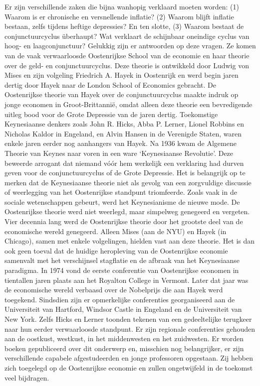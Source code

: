 \documentclass[
  a5paper,
  smalldemyvopaper,10pt,twoside,onecolumn,openright,extrafontsizes,hidelinks]{memoir}
\begin{document}
Er zijn verschillende zaken die bijna wanhopig verklaard moeten worden:
(1) Waarom is er chronische en versnellende inflatie? (2) Waarom blijft
inflatie bestaan, zelfs tijdens heftige depressies? En ten slotte, (3)
Waarom bestaat de conjunctuurcyclus überhaupt? Wat verklaart de
schijnbaar oneindige cyclus van hoog- en laagconjunctuur? Gelukkig zijn
er antwoorden op deze vragen. Ze komen van de vaak verwaarloosde
Oostenrijkse School van de economie en haar theorie over de geld- en
conjunctuurcyclus. Deze theorie is ontwikkeld door Ludwig von Mises en
zijn volgeling Friedrich A. Hayek in Oostenrijk en werd begin jaren
dertig door Hayek naar de London School of Economics gebracht. De
Oostenrijkse theorie van Hayek over de conjunctuurcyclus maakte indruk
op jonge economen in Groot-Brittannië, omdat alleen deze theorie een
bevredigende uitleg bood voor de Grote Depressie van de jaren dertig.
Toekomstige Keynesiaanse denkers zoals John R. Hicks, Abba P. Lerner,
Lionel Robbins en Nicholas Kaldor in Engeland, en Alvin Hansen in de
Verenigde Staten, waren enkele jaren eerder nog aanhangers van Hayek. Na
1936 kwam de Algemene Theorie van Keynes naar voren in een ware
`Keynesiaanse Revolutie'. Deze beweerde arrogant dat niemand vóór hem
werkelijk een verklaring had durven geven voor de conjunctuurcyclus of
de Grote Depressie. Het is belangrijk op te merken dat de Keynesiaanse
theorie niet als gevolg van een zorgvuldige discussie of weerlegging van
het Oostenrijkse standpunt triomfeerde. Zoals vaak in de sociale
wetenschappen gebeurt, werd het Keynesianisme de nieuwe mode. De
Oostenrijkse theorie werd niet weerlegd, maar simpelweg genegeerd en
vergeten. Vier decennia lang werd de Oostenrijkse theorie door het
grootste deel van de economische wereld genegeerd. Alleen Mises (aan de
NYU) en Hayek (in Chicago), samen met enkele volgelingen, hielden vast
aan deze theorie. Het is dan ook geen toeval dat de huidige heropleving
van de Oostenrijkse economie samenvalt met het verschijnsel stagflatie
en de afbraak van het Keynesiaanse paradigma. In 1974 vond de eerste
conferentie van Oostenrijkse economen in tientallen jaren plaats aan het
Royalton College in Vermont. Later dat jaar was de economische wereld
verbaasd over de Nobelprijs die aan Hayek werd toegekend. Sindsdien zijn
er opmerkelijke conferenties georganiseerd aan de Universiteit van
Hartford, Windsor Castle in Engeland en de Universiteit van New York.
Zelfs Hicks en Lerner toonden tekenen van een gedeeltelijke terugkeer
naar hun eerder verwaarloosde standpunt. Er zijn regionale conferenties
gehouden aan de oostkust, westkust, in het middenwesten en het
zuidwesten. Er worden boeken gepubliceerd over dit onderwerp en,
misschien nog belangrijker, er zijn verschillende capabele
afgestudeerden en jonge professoren opgestaan. Zij hebben zich toegelegd
op de Oostenrijkse economie en zullen ongetwijfeld in de toekomst veel
bijdragen.
\end{document}
